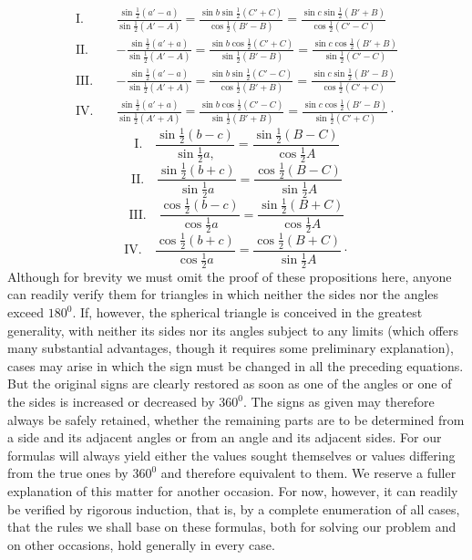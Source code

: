 {\[
\begin{aligned}
\mathrm{I.}\quad&\frac{\sin\frac{1}{2}(a'-a)}{\sin\frac{1}{2}(A'-A)}=\frac{\sin b\sin\frac{1}{2}(C'+C)}{\cos\frac{1}{2}(B'-B)}=\frac{\sin c\sin\frac{1}{2}(B'+B)}{\cos\frac{1}{2}(C'-C)}\\[.5em]
\mathrm{II.}\quad&-\frac{\sin\frac{1}{2}(a'+a)}{\sin\frac{1}{2}(A'-A)}=\frac{\sin b\cos\frac{1}{2}(C'+C)}{\sin\frac{1}{2}(B'-B)}=\frac{\sin c\cos\frac{1}{2}(B'+B)}{\sin\frac{1}{2}(C'-C)}\\[.5em]
\mathrm{III.}\quad&-\frac{\sin\frac{1}{2}(a'-a)}{\sin\frac{1}{2}(A'+A)}=\frac{\sin b\sin\frac{1}{2}(C'-C)}{\cos\frac{1}{2}(B'+B)}=\frac{\sin c\sin\frac{1}{2}(B'-B)}{\cos\frac{1}{2}(C'+C)}\\[.5em]
\mathrm{IV.}\quad&\frac{\sin\frac{1}{2}(a'+a)}{\sin\frac{1}{2}(A'+A)}=\frac{\sin b\cos\frac{1}{2}(C'-C)}{\sin\frac{1}{2}(B'+B)}=\frac{\sin c\cos\frac{1}{2}(B'-B)}{\sin\frac{1}{2}(C'+C)}\cdot
\end{aligned}
\]
}
\[
\mathrm{I.}\quad\frac{\sin\frac{1}{2}(b-c)}{\sin\frac{1}{2}a{,}}=\frac{\sin\frac{1}{2}(B-C)}{\cos\frac{1}{2}A}
\]
\[
\mathrm{II.}\quad\frac{\sin\frac{1}{2}(b+c)}{\sin\frac{1}{2}a}=\frac{\cos\frac{1}{2}(B-C)}{\sin\frac{1}{2}A}
\]
\[
\mathrm{III.}\quad\frac{\cos\frac{1}{2}(b-c)}{\cos\frac{1}{2}a}=\frac{\sin\frac{1}{2}(B+C)}{\cos\frac{1}{2}A}
\]
\[
\mathrm{IV.}\quad\frac{\cos\frac{1}{2}(b+c)}{\cos\frac{1}{2}a}=\frac{\cos\frac{1}{2}(B+C)}{\sin\frac{1}{2}A}\cdot
\]
Although for brevity we must omit the proof of these propositions here, anyone can readily verify them for triangles in which neither the sides nor the angles exceed $180^0$. If, however, the spherical triangle is conceived in the greatest generality, with neither its sides nor its angles subject to any limits (which offers many substantial advantages, though it requires some preliminary explanation), cases may arise in which the sign must be changed in all the preceding equations. But the original signs are clearly restored as soon as one of the angles or one of the sides is increased or decreased by $360^0$. The signs as given may therefore always be safely retained, whether the remaining parts are to be determined from a side and its adjacent angles or from an angle and its adjacent sides. For our formulas will always yield either the values sought themselves or values differing from the true ones by $360^0$ and therefore equivalent to them. We reserve a fuller explanation of this matter for another occasion. For now, however, it can readily be verified by rigorous induction, that is, by a complete enumeration of all cases, that the rules we shall base on these formulas, both for solving our problem and on other occasions, hold generally in every case.
